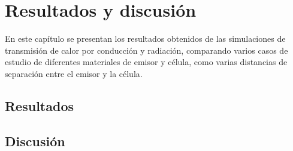 \chapter{Resultados y discusión}

En este capítulo se presentan los resultados obtenidos de las simulaciones de transmisión de calor por conducción y radiación, comparando varios casos de estudio de diferentes materiales de emisor y célula, como varias distancias de separación entre el emisor y la célula.


\section{Resultados}
\begin{figure}
\end{figure}


\section{Discusión}